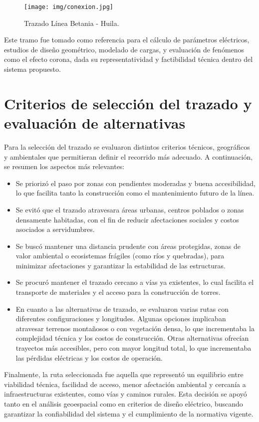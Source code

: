 \begin{figure}[!ht]
\centering
\texttt{[image: img/conexion.jpg]}
\caption{Trazado Línea Betania - Huila.}
\label{fig:tramoBH}
\end{figure}

Este tramo fue tomado como referencia para el cálculo de parámetros eléctricos, estudios de diseño geométrico, modelado de cargas, y evaluación de fenómenos como el efecto corona, dada su representatividad y factibilidad técnica dentro del sistema propuesto.

\section*{Criterios de selección del trazado y evaluación de alternativas}

Para la selección del trazado se evaluaron distintos criterios técnicos, geográficos y ambientales que permitieran definir el recorrido más adecuado. A continuación, se resumen los aspectos más relevantes:

\begin{itemize}
    \item Se priorizó el paso por zonas con pendientes moderadas y buena accesibilidad, lo que facilita tanto la construcción como el mantenimiento futuro de la línea.
    
    \item Se evitó que el trazado atravesara áreas urbanas, centros poblados o zonas densamente habitadas, con el fin de reducir afectaciones sociales y costos asociados a servidumbres.
    
    \item Se buscó mantener una distancia prudente con áreas protegidas, zonas de valor ambiental o ecosistemas frágiles (como ríos y quebradas), para minimizar afectaciones y garantizar la estabilidad de las estructuras.
    
    \item Se procuró mantener el trazado cercano a vías ya existentes, lo cual facilita el transporte de materiales y el acceso para la construcción de torres.
    
    \item En cuanto a las alternativas de trazado, se evaluaron varias rutas con diferentes configuraciones y longitudes. Algunas opciones implicaban atravesar terrenos montañosos o con vegetación densa, lo que incrementaba la complejidad técnica y los costos de construcción. Otras alternativas ofrecían trayectos más accesibles, pero con mayor longitud total, lo que incrementaba las pérdidas eléctricas y los costos de operación.
\end{itemize}


Finalmente, la ruta seleccionada fue aquella que representó un equilibrio entre viabilidad técnica, facilidad de acceso, menor afectación ambiental y cercanía a infraestructuras existentes, como vías y caminos rurales. Esta decisión se apoyó tanto en el análisis geoespacial como en criterios de diseño 
eléctrico, buscando garantizar la confiabilidad del sistema y el cumplimiento de la normativa vigente.